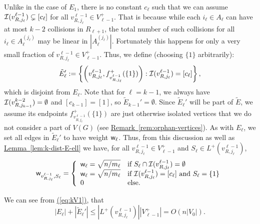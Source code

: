 \documentclass{theoretics}
\newcommand{\eq}[1]{\hyperref[eq:#1]{(\ref*{eq:#1})}}
\newcommand{\lem}[1]{\hyperref[lem:#1]{Lemma~\ref*{lem:#1}}}
\newcommand{\rem}[1]{\hyperref[rem:#1]{Remark~\ref*{rem:#1}}}
\renewcommand{\>}{\rangle}
\newcommand{\<}{\langle}
\renewcommand{\(}{\left(}
\renewcommand{\)}{\right)}
\def\abs#1{\left| #1 \right|}
\def\w{{\sf w}}
\begin{document}
Unlike in the case of $E_1$, there is no constant $c_{\ell}$ such that we can assume ${\cal I}(v_{R,j_{\ell}}^{\ell-1})\subsetneq [c_{\ell}]$ for all $v_{R,j_{\ell}}^{\ell-1}\in V_{\ell-1}^+$. That is because while each $i_{\ell}\in A_{\ell}$ can have at most $k-2$ collisions in $R_{\ell+1}$, the total number of such collisions for all $i_{\ell}\in A_{\ell}^{(j_{\ell})}$ may be linear in $|A_{\ell}^{(j_{\ell})}|$. Fortunately this happens for only a very small fraction of $v_{R,j_{\ell}}^{\ell-1}\in V_{\ell-1}^+$. Thus, we define (choosing $\{1\}$ arbitrarily):
\begin{equation}
	\tilde{E}_{\ell}':=\left\{\left(v^{\ell-1}_{R,j_{\ell}},f^+_{v^{\ell-1}_{R,j_{\ell}}}(\{1\})\right): {\cal I}(v^{\ell-1}_{R,j_{\ell}})=[c_{\ell}]\right\},\label{eq:k-dist-tilde-E-prime}
\end{equation}
which is disjoint from $E_{\ell}$. Note that for $\ell=k-1$, we always have ${\cal I}(v^{k-2}_{R,j_{k-1}})=\emptyset$ and $[c_{k-1}]=[1]$, so $\tilde{E}_{k-1}'=\emptyset$.
Since $\tilde{E}_{\ell}'$ will be part of $\tilde{E}$, we assume its endpoints $f^+_{v^{\ell-1}_{R,j_{\ell}}}(\{1\})$ are just otherwise isolated vertices that we do not consider a part of $V(G)$ (see \rem{orphan-vertices}). As with $E_{\ell}$, we set all edges in $\tilde{E}_{\ell}'$ to have weight $\w_{\ell}$. Thus, from this discussion as well as \lem{k-dist-E-ell} we have,
for all $v^{\ell-1}_{R,j_{\ell}}\in V_{\ell-1}^+$ and $S_{\ell}\in L^+(v^{\ell-1}_{R,j_{\ell}})$,
\begin{equation}
\w_{v^{\ell-1}_{R,j_{\ell}},S_{\ell}} = \left\{\begin{array}{ll}
\w_{\ell} =\sqrt{n/m_{\ell}} & \mbox{if }S_{\ell}\cap {\cal I}(v^{\ell-1}_{R,j_{\ell}}) = \emptyset\\
\w_{\ell} =\sqrt{n/m_{\ell}} & \mbox{if }{\cal I}(v^{\ell-1}_{R,j_{\ell}})=[c_{\ell}]\mbox{ and }S_{\ell}=\{1\}\\
0 & \mbox{else.}
\end{array}\right.\label{eq:k-dist-w-ell-cond}
\end{equation}


\noindent We can see from \eq{kV1}, that 
\begin{equation}
	\abs{E_{\ell}}+\abs{\tilde{E}_{\ell}'} \leq \abs{L^+(v_{R,j_{\ell}}^{\ell-1})}\abs{V_{\ell-1}^+} = O\left(n\abs{V_0}\right).\label{eq:kEk1}
\end{equation}
\end{document}
